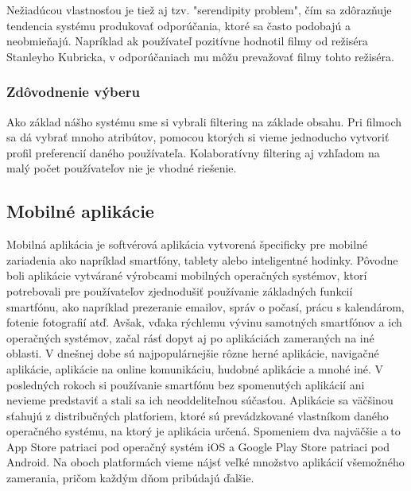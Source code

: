 Nežiadúcou vlastnosťou je tiež aj tzv. "serendipity problem", čím sa zdôrazňuje tendencia systému produkovať odporúčania, ktoré sa často podobajú a neobmieňajú. Napríklad ak používateľ pozitívne hodnotil filmy od režiséra Stanleyho Kubricka, v odporúčaniach mu môžu prevažovať filmy tohto režiséra. \cite{rs1} \\

\subsubsection{Zdôvodnenie výberu}
Ako základ nášho systému sme si vybrali filtering na základe obsahu. Pri filmoch sa dá vybrať mnoho atribútov, pomocou ktorých si vieme jednoducho vytvoriť profil preferencií daného používateľa. Kolaboratívny filtering aj vzhľadom na malý počet používateľov nie je vhodné riešenie.

\subsection{Mobilné aplikácie}
Mobilná aplikácia je softvérová aplikácia vytvorená špecificky pre mobilné zariadenia ako napríklad smartfóny, tablety alebo inteligentné hodinky. \cite{ma1} Pôvodne boli aplikácie vytvárané výrobcami mobilných operačných systémov, ktorí potrebovali pre používateľov zjednodušiť používanie základných funkcií smartfónu, ako napríklad prezeranie emailov, správ o počasí, prácu s kalendárom, fotenie fotografií atď. \cite{ma2} Avšak, vďaka rýchlemu vývinu samotných smartfónov a ich operačných systémov, začal rásť dopyt aj po aplikáciách zameraných na iné oblasti. V dnešnej dobe sú najpopulárnejšie rôzne herné aplikácie, navigačné aplikácie, aplikácie na online komunikáciu, hudobné aplikácie a mnohé iné. V posledných rokoch si používanie smartfónu bez spomenutých aplikácií ani nevieme predstaviť a stali sa ich neoddeliteľnou súčasťou. Aplikácie sa väčšinou sťahujú z distribučných platforiem, ktoré sú prevádzkované vlastníkom daného operačného systému, na ktorý je aplikácia určená. Spomeniem dva najväčšie a to App Store patriaci pod operačný systém iOS a Google Play Store patriaci pod Android. Na oboch platformách vieme nájsť veľké množstvo aplikácií všemožného zamerania, pričom každým dňom pribúdajú ďalšie. \cite{ma1} \\
